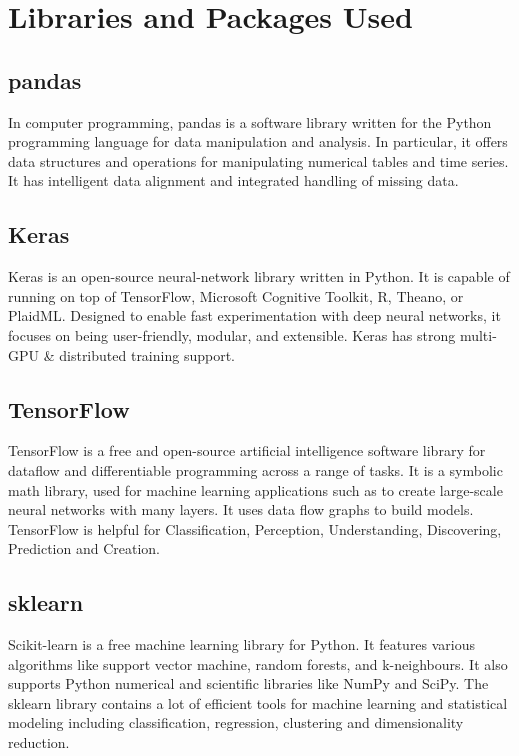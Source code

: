 \documentclass[11pt]{report}
\begin{document}
\section{Libraries and Packages Used}

\subsection{pandas}
In computer programming, pandas is a software library written for the Python programming language for data manipulation and analysis. In particular, it offers data structures and operations for manipulating numerical tables and time series. It has intelligent data alignment and integrated handling of missing data.

\subsection{Keras}
Keras is an open-source neural-network library written in Python. It is capable of running on top of TensorFlow, Microsoft Cognitive Toolkit, R, Theano, or PlaidML. Designed to enable fast experimentation with deep neural networks, it focuses on being user-friendly, modular, and extensible. Keras has strong multi-GPU \& distributed training support.

\subsection{TensorFlow}
TensorFlow is a free and open-source artificial intelligence software library for dataflow and differentiable programming across a range of tasks. It is a symbolic math library, used for machine learning applications such as to create large-scale neural networks with many layers. It uses data flow graphs to build models. TensorFlow is helpful for Classification, Perception, Understanding, Discovering, Prediction and Creation.

\subsection{sklearn} 
Scikit-learn is a free machine learning library for Python. It features various algorithms like support vector machine, random forests, and k-neighbours. It also supports Python numerical and scientific libraries like NumPy and SciPy. The sklearn library contains a lot of efficient tools for machine learning and statistical modeling including classification, regression, clustering and dimensionality reduction.
\end{document}
